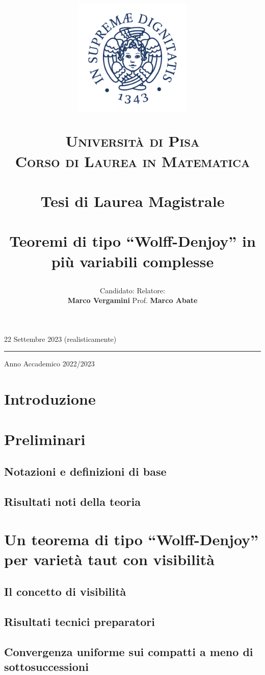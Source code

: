 \documentclass{article}
\title{\begin{figure}[t!]
    \centering
    \includegraphics[trim=0 55 0 60, clip, width=0.5\textwidth]{Stemma_unipi.jpg}
  \end{figure}
  \vspace{-17.5mm}
  \textsc{\Large Università di Pisa}\\
  \textsc{\large Corso di Laurea in Matematica}\\
  \, \\
  {\large Tesi di Laurea Magistrale}\\
  \, \\
  Teoremi di tipo ``Wolff-Denjoy'' in più variabili complesse}
\author{Candidato:  \hspace{200px} Relatore:\\
  \textbf{Marco Vergamini} \hfill Prof. \textbf{Marco Abate}}
\date{}
\begin{document}
  \maketitle
  \vspace*{\fill}
  \begin{center}
    22 Settembre 2023 (realisticamente)
    \par\noindent\rule{\textwidth}{0.5pt}
    \Large Anno Accademico 2022/2023
  \end{center}
  \newpage
  \tableofcontents
  \newpage


\section*{Introduzione}


\newpage

\section{Preliminari} \label{Preliminari}
\subsection{Notazioni e definizioni di base}

\subsection{Risultati noti della teoria} \label{risnoti}


\newpage

\section{Un teorema di tipo ``Wolff-Denjoy'' per varietà taut con visibilità} \label{Un teorema di tipo ``Wolff-Denjoy'' per varietà taut con visibilità}
\subsection{Il concetto di visibilità}

\subsection{Risultati tecnici preparatori}

\subsection{Convergenza uniforme sui compatti a meno di sottosuccessioni}

\end{document}
